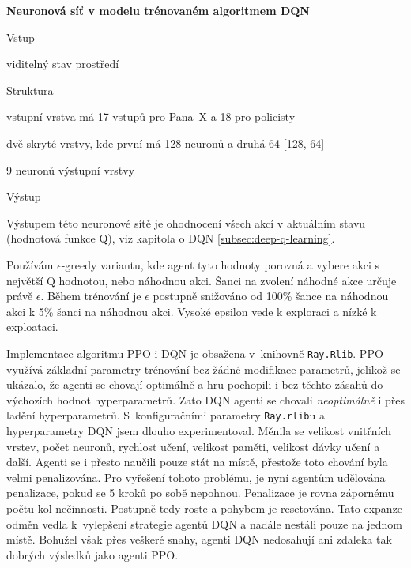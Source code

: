     \textbf{Neuronová síť v modelu trénovaném algoritmem DQN}
    \begin{myitemize}
      \item Vstup
        \begin{myitemize}
          \item viditelný stav prostředí
        \end{myitemize}
      \item Struktura
        \begin{myitemize}
          \item vstupní vrstva má 17 vstupů pro Pana~X a 18 pro policisty
          \item dvě skryté vrstvy, kde první má 128 neuronů a druhá 64 [128, 64]
          \item 9 neuronů výstupní vrstvy
        \end{myitemize}
      \item Výstup
        \begin{myitemize}
          \item Výstupem této neuronové sítě je ohodnocení všech akcí v aktuálním stavu (hodnotová funkce Q), viz kapitola o DQN \ref{subsec:deep-q-learning}.
          \item Používám $\epsilon$-greedy variantu, kde agent tyto hodnoty porovná a vybere akci s největší Q hodnotou, nebo náhodnou akci.
          Šanci na zvolení náhodné akce určuje právě $\epsilon$. Během trénování je $\epsilon$ postupně snižováno od 100\% šance na náhodnou akci k 5\% šanci na náhodnou akci.
          Vysoké epsilon vede k exploraci a nízké k exploataci.
        \end{myitemize}
    \end{myitemize}


  \bigskip



Implementace algoritmu PPO i DQN je obsažena v~knihovně \texttt{Ray.Rlib}.
PPO využívá základní parametry trénování bez žádné modifikace parametrů, jelikož se ukázalo, že agenti se chovají optimálně a hru pochopili i bez těchto zásahů do výchozích hodnot hyperparametrů.
Zato DQN agenti se chovali \emph{neoptimálně} i přes ladění hyperparametrů.
S~konfiguračními parametry \texttt{Ray.rlib}u a hyperparametry DQN jsem dlouho experimentoval.
Měnila se velikost vnitřních vrstev, počet neuronů, rychlost učení, velikost paměti, velikost dávky učení a další.
Agenti se i přesto naučili pouze stát na místě, přestože toto chování byla velmi penalizována.
Pro vyřešení tohoto problému, je nyní agentům udělována penalizace, pokud se 5 kroků po sobě nepohnou.
Penalizace je rovna zápornému počtu kol nečinnosti.
Postupně tedy roste a pohybem je resetována.
Tato expanze odměn vedla k~vylepšení strategie agentů DQN a nadále nestáli pouze na jednom místě.
Bohužel však přes veškeré snahy, agenti DQN nedosahují ani zdaleka tak dobrých výsledků jako agenti PPO\@.



